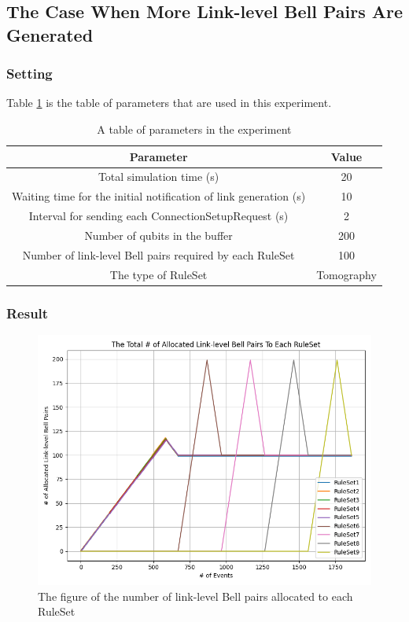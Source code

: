 \newpage

\subsection{The Case When More Link-level Bell Pairs Are Generated}

\subsubsection{Setting}
Table \ref{table:parameter-for-experiment3} is the table of parameters that are used in this experiment.

\begin{table}[ht]
  \begin{center}
    \begin{tabular}{|c|c|} 
      \hline
      Parameter & Value \\ \hline \cline{1-2}
      Total simulation time (s) &  20 \\ \cline{1-2}
      Waiting time for the initial notification of link generation (s) &  10 \\ \cline{1-2} 
      Interval for sending each ConnectionSetupRequest (s) &  2 \\ \cline{1-2} 
      Number of qubits in the buffer & 200  \\  \cline{1-2}
      Number of link-level Bell pairs required by each RuleSet &  100 \\ \cline{1-2}
      The type of RuleSet & Tomography \\  \hline  \cline{1-2}
    \end{tabular}
    \caption{A table of parameters in the experiment}
    \label{table:parameter-for-experiment3}
  \end{center}
\end{table}

\subsubsection{Result}
\begin{figure}[H]
  \centerline{\includegraphics[width=.6\columnwidth]{images/result3.png}}
  \caption{The figure of the number of link-level Bell pairs allocated to each RuleSet}
  \label{fig:result3}
\end{figure}


